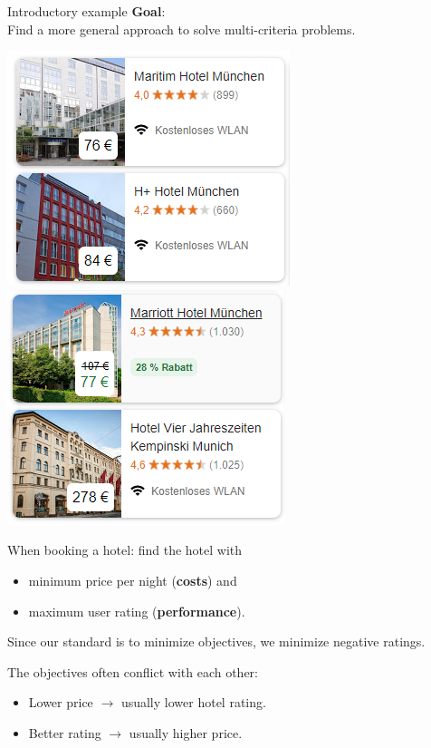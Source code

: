 \documentclass[11pt,compress,t,notes=noshow, xcolor=table]{beamer}
\begin{document}
\begin{vbframe}{Introductory example}
\normalsize
\vspace{0.5cm}
\textbf{Goal}:\\
\footnotesize
Find a more general approach to solve multi-criteria problems.\\

\framebreak

\normalsize

\begin{center}
\includegraphics[width = 0.45\linewidth]{figure_man/booking1.png} ~~~ \includegraphics[width = 0.45\linewidth]{figure_man/booking2.png}
\end{center}

When booking a hotel: find the hotel with

\begin{itemize}
\item minimum price per night (\textbf{costs}) and
\item maximum user rating (\textbf{performance}).
\end{itemize}

\vfill

\begin{footnotesize}
Since our standard is to minimize objectives, we minimize negative ratings.
\end{footnotesize}

\framebreak


The objectives often conflict with each other:

\begin{itemize}
\item Lower price $\to$ usually lower hotel rating.
\item Better rating $\to$ usually higher price.
\end{itemize}


\end{vbframe}
\end{document}
